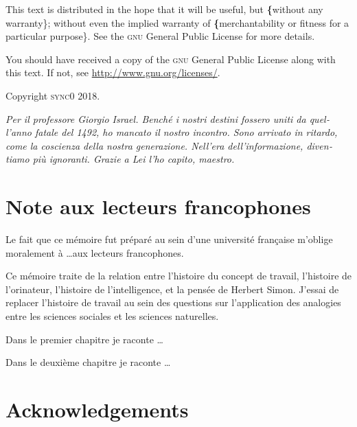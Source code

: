 \documentclass[version=last,draft=false,paper=A4,portrait,twoside=true,twocolumn=false,headinclude=false,footinclude=false,fontsize=11,BCOR=20mm,DIV=calc,pagesize=auto,titlepage=firstiscover,mpinclude=false,open=right,chapterprefix=true,numbers=autoendperiod,headsepline=false,parskip=false]{scrbook}
\begin{document}
This text is distributed in the hope that it will be useful, but \textbf\{without
any warranty\}; without even the implied warranty of \textbf\{merchantability or 
fitness for a particular purpose\}. See the \textsc{gnu} General 
Public License for more details.

You should have received a copy of the \textsc{gnu} General Public License along
with this text. If not, see \url{http://www.gnu.org/licenses/}.

\vspace{1\baselineskip}
\noindent
Copyright \textcopyright \textsc{sync0} 2018. 

\newpage 
\begin{FlushRight}
\begin{italian}
\textit{Per il professore Giorgio Israel. \newline Benché i nostri destini fossero uniti da quell'anno fatale del 1492, \linebreak ho mancato il nostro incontro. \linebreak Sono arrivato in ritardo, come la coscienza della nostra generazione. \linebreak Nell'era dell'informazione, diventiamo più ignoranti. \linebreak Grazie a Lei l'ho capito, maestro.}
\end{italian}
\end{FlushRight}

\newpage
\tableofcontents 

\frontmatter
\pagestyle{plain}
\chapter{Note aux lecteurs francophones} 
Le fait que ce mémoire fut préparé au sein d'une université française
m'oblige moralement à \ldots aux lecteurs francophones. 

Ce mémoire traite de la relation entre l'histoire du concept de travail,
l'histoire de l'orinateur, l'histoire de l'intelligence, et la pensée de
Herbert Simon. J'essai de replacer l'histoire de travail au sein des
questions sur  l'application des analogies entre les sciences sociales et
les sciences naturelles.  

Dans le premier chapitre je raconte \ldots 

Dans le deuxième chapitre je raconte \ldots 

\lipsum
\chapter{Acknowledgements} 
\lipsum
\end{document}
